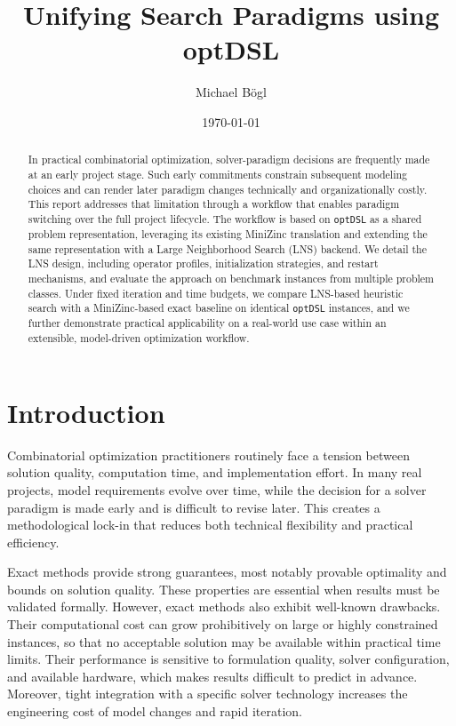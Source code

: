 \documentclass[11pt,a4paper]{article}
\title{Unifying Search Paradigms using optDSL}
\author{
  Michael Bögl
}
\date{\today}
\begin{document}
\maketitle

\begin{abstract}
In practical combinatorial optimization, solver-paradigm decisions are frequently made at an early project stage.
Such early commitments constrain subsequent modeling choices and can render later paradigm changes technically and organizationally costly.
This report addresses that limitation through a workflow that enables paradigm switching over the full project lifecycle.
The workflow is based on \texttt{optDSL} as a shared problem representation, leveraging its existing MiniZinc translation and extending the same representation with a Large Neighborhood Search (LNS) backend.
We detail the LNS design, including operator profiles, initialization strategies, and restart mechanisms, and evaluate the approach on benchmark instances from multiple problem classes.
Under fixed iteration and time budgets, we compare LNS-based heuristic search with a MiniZinc-based exact baseline on identical \texttt{optDSL} instances, and we further demonstrate practical applicability on a real-world use case within an extensible, model-driven optimization workflow.
\end{abstract}

\section{Introduction}
Combinatorial optimization practitioners routinely face a tension between solution quality, computation time, and implementation effort.
In many real projects, model requirements evolve over time, while the decision for a solver paradigm is made early and is difficult to revise later.
This creates a methodological lock-in that reduces both technical flexibility and practical efficiency.

Exact methods provide strong guarantees, most notably provable optimality and bounds on solution quality.
These properties are essential when results must be validated formally.
However, exact methods also exhibit well-known drawbacks.
Their computational cost can grow prohibitively on large or highly constrained instances, so that no acceptable solution may be available within practical time limits.
Their performance is sensitive to formulation quality, solver configuration, and available hardware, which makes results difficult to predict in advance.
Moreover, tight integration with a specific solver technology increases the engineering cost of model changes and rapid iteration.
\end{document}
